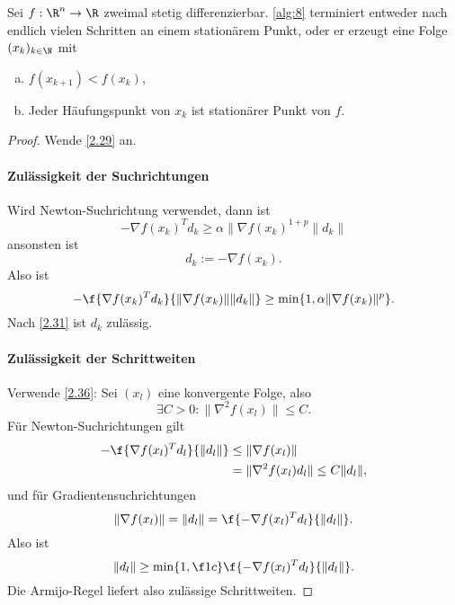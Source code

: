 \begin{st} \label{2.57}
	Sei $f: \R^n \to \R$ zweimal stetig differenzierbar.
	\ref{alg:8} terminiert entweder nach endlich vielen Schritten an einem stationärem Punkt, oder er erzeugt eine Folge $(x_k)_{k\in\N}$ mit
	\begin{enumerate}[(a)]
		\item
			$f(x_{k+1}) < f(x_k)$,
		\item
			Jeder Häufungspunkt von $x_k$ ist stationärer Punkt von $f$.
	\end{enumerate}
	\begin{proof}
		Wende \ref{2.29} an.
		\paragraph{Zulässigkeit der Suchrichtungen}
		Wird Newton-Suchrichtung verwendet, dann ist
		\[
			-\nabla f(x_k)^T d_k \ge \alpha \|\nabla f(x_k)^{1+p}\|d_k\|
		\]
		ansonsten ist
		\[
			d_k := -\nabla f(x_k).
		\]
		Also ist
		\[
			- \f {\nabla f(x_k)^T d_k}{\|\nabla f(x_k)\|\|d_k\|}
			\ge \min \{ 1, \alpha \|\nabla f(x_k)\|^p \}.
		\]
		Nach \ref{2.31} ist $d_k$ zulässig.
		\paragraph{Zulässigkeit der Schrittweiten}
		Verwende \ref{2.36}:
		Sei $(x_l)$ eine konvergente Folge, also
		\[
			\exists C > 0 : \|\nabla^2 f(x_l)\| \le C.
		\]
		Für Newton-Suchrichtungen gilt
		\begin{align*}
			- \f {\nabla f(x_l)^T d_l}{\|d_l\|}
			&\le \|\nabla f(x_l)\| \\
			&= \|\nabla^2 f(x_l) d_l\|
			\le C \|d_l\|,
		\end{align*}
		und für Gradientensuchrichtungen
		\[
			\|\nabla f(x_l)\|
			= \|d_l\|
			= \f {-\nabla f(x_l)^T d_l}{\|d_l\|}.
		\]
		Also ist
		\[
			\|d_l\|
			\ge \min \{1, \f 1c \} \f {-\nabla f(x_l)^T d_l}{\|d_l\|}.
		\]
		Die Armijo-Regel liefert also zulässige Schrittweiten.
	\end{proof}
\end{st}

